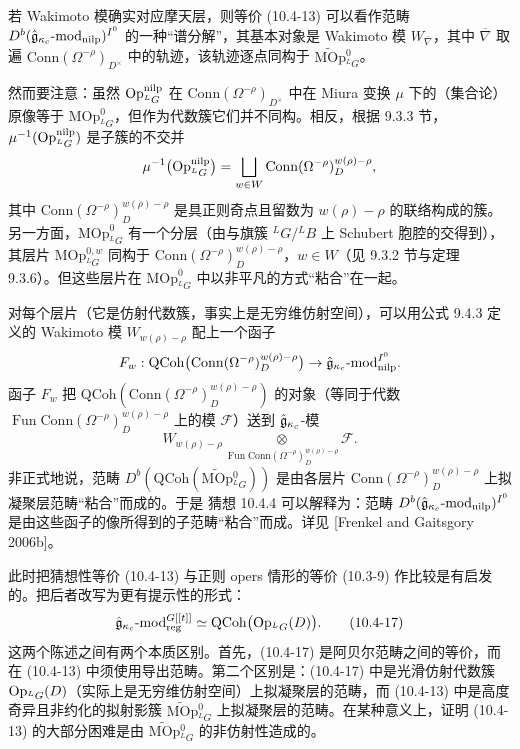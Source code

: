 若 Wakimoto 模确实对应摩天层，则等价 (10.4-13) 可以看作范畴 $D^b(\hat{\mathfrak{g}}_{\kappa_c}\text{-}\mathrm{mod}_{\mathrm{nilp}})^{I^0}$ 的一种“谱分解”，其基本对象是 Wakimoto 模 $W_{\overline{\nabla}}$，其中 $\overline{\nabla}$ 取遍 $\mathrm{Conn}(\Omega^{-\rho})_{D^\times}$ 中的轨迹，该轨迹逐点同构于 $\widetilde{\mathrm{MOp}}{}^0_{{}^L G}$。

然而要注意：虽然 $\operatorname{Op}^{\mathrm{nilp}}_{{}^L G}$ 在 $\mathrm{Conn}(\Omega^{-\rho})_{D^\times}$ 中在 Miura 变换 $\mu$ 下的（集合论）原像等于 $\mathrm{MOp}^0_{{}^L G}$，但作为代数簇它们并不同构。相反，根据 9.3.3 节，$\mu^{-1}(\operatorname{Op}^{\mathrm{nilp}}_{{}^L G})$ 是子簇的不交并
\[
    \mu^{-1}\bigl(\operatorname{Op}^{\mathrm{nilp}}_{{}^L G}\bigr)
    =\bigsqcup_{w\in W}\mathrm{Conn}(\Omega^{-\rho})^{w(\rho)-\rho}_D,
\]
其中 $\mathrm{Conn}(\Omega^{-\rho})^{w(\rho)-\rho}_D$ 是具正则奇点且留数为 $w(\rho)-\rho$ 的联络构成的簇。另一方面，$\mathrm{MOp}^0_{{}^L G}$ 有一个分层（由与旗簇 ${}^L G/{}^L B$ 上 Schubert 胞腔的交得到），其层片 $\mathrm{MOp}^{0,w}_{{}^L G}$ 同构于 $\mathrm{Conn}(\Omega^{-\rho})^{w(\rho)-\rho}_D$，$w\in W$（见 9.3.2 节与定理 9.3.6）。但这些层片在 $\mathrm{MOp}^0_{{}^L G}$ 中以非平凡的方式“粘合”在一起。

对每个层片（它是仿射代数簇，事实上是无穷维仿射空间），可以用公式 9.4.3 定义的 Wakimoto 模 $W_{w(\rho)-\rho}$ 配上一个函子
\[
    F_w:\mathrm{QCoh}\bigl(\mathrm{Conn}(\Omega^{-\rho})^{w(\rho)-\rho}_D\bigr)
    \to\hat{\mathfrak{g}}_{\kappa_c}\text{-}\mathrm{mod}_{\mathrm{nilp}}^{I^0}.
\]
函子 $F_w$ 把 $\mathrm{QCoh}(\mathrm{Conn}(\Omega^{-\rho})^{w(\rho)-\rho}_D)$ 的对象（等同于代数 $\operatorname{Fun}\mathrm{Conn}(\Omega^{-\rho})^{w(\rho)-\rho}_D$ 上的模 $\mathcal{F}$）送到 $\hat{\mathfrak{g}}_{\kappa_c}$-模
\[
    W_{w(\rho)-\rho}
    \underset{\operatorname{Fun}\mathrm{Conn}(\Omega^{-\rho})^{w(\rho)-\rho}_D}{\otimes}
    \mathcal{F}.
\]
非正式地说，范畴 $D^b(\mathrm{QCoh}(\widetilde{\mathrm{MOp}}{}^0_{{}^L G}))$ 是由各层片 $\mathrm{Conn}(\Omega^{-\rho})^{w(\rho)-\rho}_D$ 上拟凝聚层范畴“粘合”而成的。于是 猜想 10.4.4 可以解释为：范畴 $D^b(\hat{\mathfrak{g}}_{\kappa_c}\text{-}\mathrm{mod}_{\mathrm{nilp}})^{I^0}$ 是由这些函子的像所得到的子范畴“粘合”而成。详见 [Frenkel and Gaitsgory 2006b]。

此时把猜想性等价 (10.4-13) 与正则 opers 情形的等价 (10.3-9) 作比较是有启发的。把后者改写为更有提示性的形式：
\begin{equation}
    \hat{\mathfrak{g}}_{\kappa_c}\text{-}\mathrm{mod}_{\mathrm{reg}}^{G[[t]]}
    \simeq\mathrm{QCoh}\bigl(\operatorname{Op}_{{}^L G}(D)\bigr).
    \tag{10.4-17}
\end{equation}
这两个陈述之间有两个本质区别。首先，(10.4-17) 是阿贝尔范畴之间的等价，而在 (10.4-13) 中须使用导出范畴。第二个区别是：(10.4-17) 中是光滑仿射代数簇 $\operatorname{Op}_{{}^L G}(D)$（实际上是无穷维仿射空间）上拟凝聚层的范畴，而 (10.4-13) 中是高度奇异且非约化的拟射影簇 $\widetilde{\mathrm{MOp}}{}^0_{{}^L G}$ 上拟凝聚层的范畴。在某种意义上，证明 (10.4-13) 的大部分困难是由 $\widetilde{\mathrm{MOp}}{}^0_{{}^L G}$ 的非仿射性造成的。

